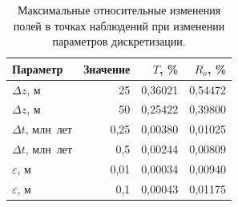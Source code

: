 \begin{table}[htbp]
\centering\small
\caption{Максимальные относительные изменения полей в точках наблюдений при изменении параметров дискретизации.}\label{tab:sensitivity}
\begin{tabular}{lrrr}
\toprule
Параметр & Значение & $T$, \% & $R_o$, \% \\
\midrule
$\Delta z$, м & 25 & 0,36021 & 0,54472 \\
$\Delta z$, м & 50 & 0,25422 & 0,39800 \\
$\Delta t$, млн~лет & 0,25 & 0,00380 & 0,01025 \\
$\Delta t$, млн~лет & 0,5 & 0,00244 & 0,00809 \\
$\varepsilon$, м & 0,01 & 0,00034 & 0,00940 \\
$\varepsilon$, м & 0,1 & 0,00043 & 0,01175 \\
\bottomrule
\end{tabular}
\end{table}
